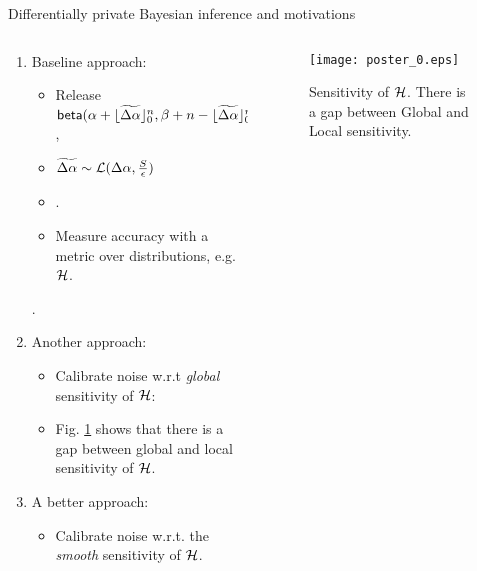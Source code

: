 \documentclass[final,hyperref={pdfpagelabels=false}]{beamer}
\begin{document}
\begin{frame}[t]
\begin{columns}[t]
\begin{column}{.485\textwidth}
\begin{block}{Differentially private Bayesian inference and motivations}
\begin{columns} %
\begin{column}{.69\textwidth}
\begin{enumerate}
\item  Baseline approach: 
  \begin{itemize}
  \item Release $\mathsf{beta}(\alpha +  \lfloor\widetilde{\Delta \alpha}\rfloor^n_0,\beta + n - \lfloor\widetilde{\Delta \alpha}\rfloor^n_0)$,
  \item $\widetilde{\Delta \alpha}\sim \mathcal{L}(\Delta\alpha, \frac{S}{\epsilon})$
  \item {}.
  \item Measure accuracy with a metric over distributions, e.g. $\mathcal{H}$.
  \end{itemize}
  {}. 
\item Another approach:
  \begin{itemize}
    \item Calibrate  noise w.r.t \emph{global} sensitivity of $\mathcal{H}$: {\color{red}{but global sensitivity is still too big.}}
    \item Fig. \ref{fig_sensitivity} shows that there is a gap between global and local sensitivity of $\mathcal{H}$.
    \end{itemize}
  \item A better approach:
    \begin{itemize}
      \item \large{Calibrate noise w.r.t. the \emph{smooth} sensitivity of $\mathcal{H}$.}
    \end{itemize}
\end{enumerate}
\end{column}
\begin{column}{.28\textwidth}
\begin{figure}[ht]
\centering
\texttt{[image: poster\_0.eps]}
\caption{\footnotesize{Sensitivity of $\mathcal{H}$. There is a gap between Global and Local sensitivity.}}
\label{fig_sensitivity}
\end{figure}
\end{column}
\end{columns}


\end{block}
\end{column}
\end{columns}
\end{frame}
\end{document}
